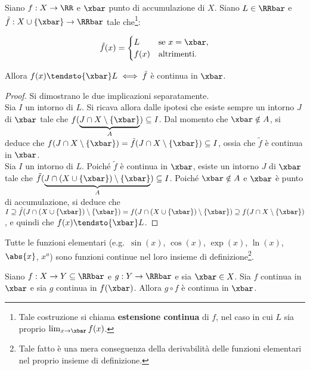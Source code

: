 \documentclass[11pt]{article}
\begin{document}
	\begin{proposition}
		Siano $f : X \to \RR$  e $\xbar$ punto di accumulazione di $X$.
		Siano $L \in \RRbar$ e $\tilde{f} : X \cup \{\xbar\} \to \RRbar$ tale
		che\footnote{Tale costruzione si chiama \textbf{estensione continua} di $f$, nel caso in cui $L$ sia proprio
			$\lim_{x \to \xbar} f(x)$.}:
		
		\[ \tilde{f}(x) = \begin{cases}
			L & \text{se } x = \xbar, \\
			f(x) & \text{altrimenti}.
		\end{cases} \]
	
		\vskip 0.05in
	
		Allora $f(x) \tendsto{\xbar} L \iff \tilde{f}$ è continua in $\xbar$.
	\end{proposition}

	\begin{proof}
		Si dimostrano le due implicazioni separatamente. \\
		
		\rightproof Sia $I$ un intorno di $L$. Si ricava allora dalle ipotesi che esiste sempre un intorno
		$J$ di $\xbar$ tale che $f(\underbrace{J \cap X \setminus \{\xbar\}}_{A}) \subseteq I$. Dal momento che $\xbar
		\notin A$, si deduce che $f(J \cap X \setminus \{\xbar\}) = \tilde{f}(J \cap X \setminus \{\xbar\}) \subseteq I$,
		ossia che $\tilde{f}$ è continua in $\xbar$. \\
		
		\leftproof Sia $I$ un intorno di $L$. Poiché $\tilde{f}$ è continua in $\xbar$, esiste un intorno $J$ di $\xbar$
		tale che $\tilde{f}(\underbrace{J \cap (X \cup \{\xbar\}) \setminus \{\xbar\}}_{A}) \subseteq I$. Poiché $\xbar \notin A$ e $\xbar$ è punto di accumulazione, si deduce che $I \supseteq \tilde{f}(J \cap (X \cup \{\xbar\}) \setminus \{\xbar\})
		= f(J \cap (X \cup \{\xbar\}) \setminus \{\xbar\}) \supseteq f(J \cap X \setminus \{\xbar\})$, e quindi che
		$f(x) \tendsto{\xbar} L$.
	\end{proof}

	\begin{remark}
		Tutte le funzioni elementari (e.g.~$\sin(x)$, $\cos(x)$, $\exp(x)$, $\ln(x)$, $\abs{x}$, $x^a$) sono funzioni continue nel loro insieme
		di definizione\footnote{Tale fatto è una mera conseguenza della
		derivabilità delle funzioni elementari nel proprio insieme di
		definizione.}.
	\end{remark}

	\begin{proposition}
		Siano $f : X \to Y \subseteq \RRbar$ e $g : Y \to \RRbar$ e sia $\xbar \in X$. Sia
		$f$ continua in $\xbar$ e sia $g$ continua in $f(\xbar)$. Allora
		$g \circ f$ è continua in $\xbar$.
	\end{proposition}
\end{document}
